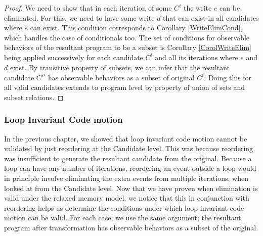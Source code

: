         \begin{proof}
            
            We need to show that in each iteration of some $C^i$ the write $e$ can be eliminated. 
            For this, we need to have some write $d$ that can exist in all candidates where $e$ can exist. 
            This condition corresponds to Corollary \ref{WriteElimCond}, which handles the case of conditionals too. 
            The set of conditions for observable behaviors of the resultant program to be a subset is Corollary \ref{CorolWriteElim} being applied successively for each candidate $C^i$ and all its iterations where $e$ and $d$ exist. 
            By transitive property of subsets, we can infer that the resultant candidate $C'^i$ has observable behaviors as a subset of original $C^i$. 
            Doing this for all valid candidates extends to program level by property of union of sets and subset relations\footnotemark.
    
                
        \end{proof}
         

        \subsubsection{Loop Invariant Code motion}  

            In the previous chapter, we showed that loop invariant code motion cannot be validated by just reordering at the Candidate level. 
            This was because reordering was insufficient to generate the resultant candidate from the original. 
            Because a loop can have any number of iterations, reordering an event outside a loop would in principle involve eliminating the extra events from multiple iterations, when looked at from the Candidate level. 
            Now that we have proven when elimination is valid under the relaxed memory model, we notice that this in conjunction with reordering helps us determine the conditions under which loop-invariant code motion can be valid.
            For each case, we use the same argument; the resultant program after transformation has observable behaviors as a subset of the original. 

